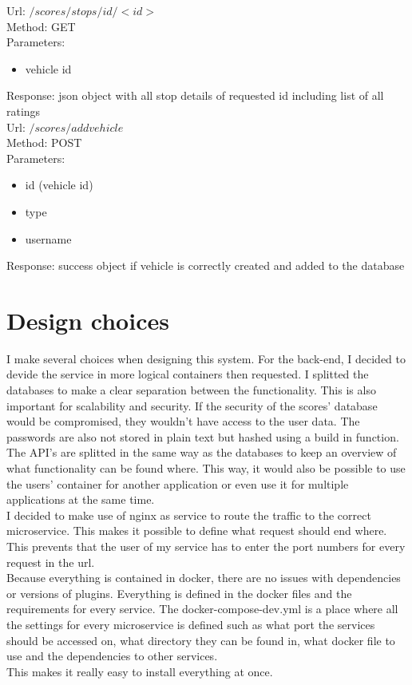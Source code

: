 \documentclass[12pt,a4paper]{article}
\begin{document}
Url: $/scores/stops/id/<id>$\\
Method: GET\\
Parameters: \begin{itemize}
\item vehicle id
\end{itemize}
Response: json object with all stop details of requested id including list of all ratings\\

Url: $/scores/addvehicle$\\
Method: POST\\
Parameters: \begin{itemize}
\item id (vehicle id)
\item type
\item username
\end{itemize}
Response: success object if vehicle is correctly created and added to the database\\



\pagebreak
\section{Design choices}
I make several choices when designing this system. For the back-end, I decided to devide the service in more logical containers then requested. I splitted the databases to make a clear separation between the functionality. This is also important for scalability and security. If the security of the scores' database would be compromised, they wouldn't have access to the user data. The passwords are also not stored in plain text but hashed using a build in function.\\

The API's are splitted in the same way as the databases to keep an overview of what functionality can be found where. This way, it would also be possible to use the users' container for another application or even use it for multiple applications at the same time.\\

I decided to make use of nginx as service to route the traffic to the correct microservice. This makes it possible to define what request should end where. This prevents that the user of my service has to enter the port numbers for every request in the url.\\

Because everything is contained in docker, there are no issues with dependencies or versions of plugins. Everything is defined in the docker files and the requirements for every service. The docker-compose-dev.yml is a place where all the settings for every microservice is defined such as what port the services should be accessed on, what directory they can be found in, what docker file to use and the dependencies to other services.\\
This makes it really easy to install everything at once.
\end{document}
